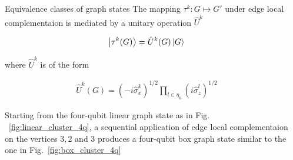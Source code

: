 \documentclass[final]{beamer}
\newlength{\sepwidth}
\newlength{\colwidth}
\newcommand{\separatorcolumn}{\begin{column}{\sepwidth}\end{column}}
\begin{document}
\begin{frame}[t]
\begin{columns}[t]
            \separatorcolumn

            \begin{column}{\colwidth}
                \begin{block}{Equivalence classes of graph states}
                    The mapping $\tau^k : G \mapsto G'$ under edge local complementaion is mediated
                    by a unitary operation
                    $\hat{U}^{k}$~\cite{PhysRevA.69.062311}

                    \begin{align}
                        \ket{\tau^k(G)} =\hat{U}^{k}(G) \ket{G}
                        \label{eq:edge_local_complementation_mapping}
                    \end{align}

                    where $\hat{U}^{k}$ is of the form

                    \begin{align}
                        \hat{U}^{k}(G) = (-i\hat{\sigma}_x^{k})^{1/2} \displaystyle\prod_{l
                        \in \eta_k} (i \hat{\sigma}_z^{l})^{1/2}
                        \label{eq:edge_local_complementation_unitary}
                    \end{align}


                    Starting from the four-qubit linear graph state as in Fig.
                    ~\ref{fig:linear_cluster_4q}, a sequential application of edge local
                    complementaion on the vertices $3, 2$ and $3$ produces a four-qubit box
                    graph state similar to the one in Fig.~\ref{fig:box_cluster_4q}


\end{block}
\end{column}
\end{columns}
\end{frame}
\end{document}
